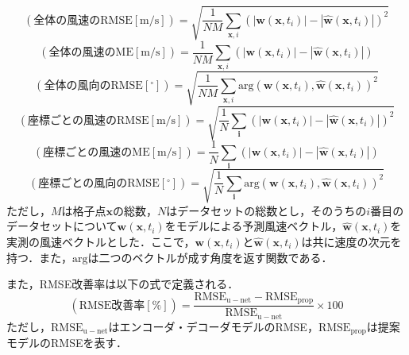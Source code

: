 \begin{equation}
  (\mathrm{全体の風速のRMSE [m/s]}) = \sqrt{\frac{1}{NM} \sum_{\bm{x}, i} (|\bm{w}(\bm{x}, t_i)| - |\hat{\bm{w}}(\bm{x}, t_i)|)^2}
  \label{eq:exp-rmse}
\end{equation}
\begin{equation}
  (\mathrm{全体の風速のME [m/s]}) = \frac{1}{NM} \sum_{\bm{x}, i} (|\bm{w}(\bm{x}, t_i)| - |\hat{\bm{w}}(\bm{x}, t_i)|)
  \label{eq:exp-me}
\end{equation}
\begin{equation}
  (\mathrm{全体の風向のRMSE [^\circ]}) = \sqrt{\frac{1}{NM} \sum_{\bm{x}, i} \mathrm{arg}(\bm{w}(\bm{x}, t_i), \hat{\bm{w}}(\bm{x}, t_i))^2}
  \label{eq:exp-rmse-direction}
\end{equation}
\begin{equation}
  (\mathrm{座標ごとの風速のRMSE [m/s]}) = \sqrt{\frac{1}{N} \sum_{\bm{i}} (|\bm{w}(\bm{x}, t_i)| - |\hat{\bm{w}}(\bm{x}, t_i)|)^2}
  \label{eq:exp-rmse-per-point}
\end{equation}
\begin{equation}
  (\mathrm{座標ごとの風速のME [m/s]}) = \frac{1}{N} \sum_{\bm{i}} (|\bm{w}(\bm{x}, t_i)| - |\hat{\bm{w}}(\bm{x}, t_i)|)
  \label{eq:exp-me-per-point}
\end{equation}
\begin{equation}
  (\mathrm{座標ごとの風向のRMSE [^\circ]}) = \sqrt{\frac{1}{N} \sum_{\bm{i}} \mathrm{arg}(\bm{w}(\bm{x}, t_i), \hat{\bm{w}}(\bm{x}, t_i))^2}
  \label{eq:exp-rmse-direction-per-point}
\end{equation}
ただし，$M$は格子点$\bm{x}$の総数，$N$はデータセットの総数とし，そのうちの$i$番目のデータセットについて$\bm{w}(\bm{x}, t_i)$をモデルによる予測風速ベクトル，$\hat{\bm{w}}(\bm{x}, t_i)$を実測の風速ベクトルとした．ここで，$\bm{w}(\bm{x}, t_i)$と$\hat{\bm{w}}(\bm{x}, t_i)$は共に速度の次元を持つ．また，$\mathrm{arg}$は二つのベクトルが成す角度を返す関数である．

また，RMSE改善率は以下の式で定義される．
\begin{equation}
  (\mathrm{RMSE改善率 [\%]}) = \frac{\mathrm{RMSE_{u-net}} - \mathrm{RMSE_{prop}}}{\mathrm{RMSE_{u-net}}} \times 100
  \label{eq:exp-rmse-improvement-rate}
\end{equation}
ただし，$\mathrm{RMSE_{u-net}}$はエンコーダ・デコーダモデルのRMSE，$\mathrm{RMSE_{prop}}$は提案モデルのRMSEを表す．


